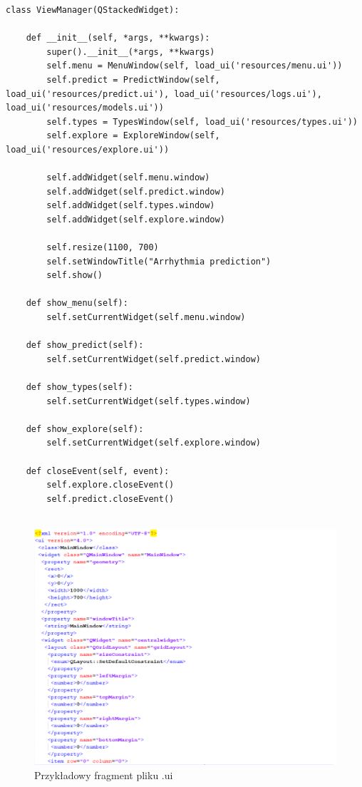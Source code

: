 \documentclass[polish,12pt]{aghthesis}
\begin{document}
\begin{lstlisting}[float=h!, caption={Kod managera widoków}]
class ViewManager(QStackedWidget):

    def __init__(self, *args, **kwargs):
        super().__init__(*args, **kwargs)
        self.menu = MenuWindow(self, load_ui('resources/menu.ui'))
        self.predict = PredictWindow(self, load_ui('resources/predict.ui'), load_ui('resources/logs.ui'), load_ui('resources/models.ui'))
        self.types = TypesWindow(self, load_ui('resources/types.ui'))
        self.explore = ExploreWindow(self, load_ui('resources/explore.ui'))

        self.addWidget(self.menu.window)
        self.addWidget(self.predict.window)
        self.addWidget(self.types.window)
        self.addWidget(self.explore.window)

        self.resize(1100, 700)
        self.setWindowTitle("Arrhythmia prediction")
        self.show()

    def show_menu(self):
        self.setCurrentWidget(self.menu.window)

    def show_predict(self):
        self.setCurrentWidget(self.predict.window)

    def show_types(self):
        self.setCurrentWidget(self.types.window)

    def show_explore(self):
        self.setCurrentWidget(self.explore.window)

    def closeEvent(self, event):
        self.explore.closeEvent()
        self.predict.closeEvent()
        
\end{lstlisting}

\begin{figure}[h!]
	\centering
	\includegraphics[width=0.9\linewidth]{ui_file.png}
	\caption{Przykładowy fragment pliku .ui}
	\label{fig:ui_file}
\end{figure}
\end{document}
